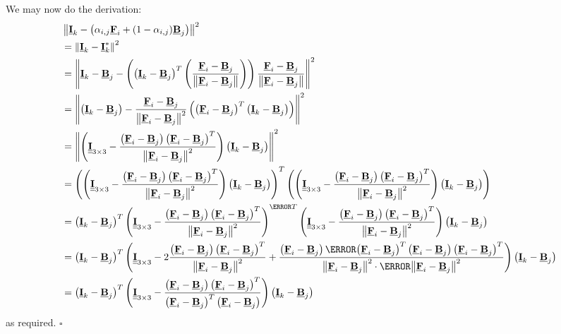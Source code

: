 \documentclass{article}
\def\vt#1{\underline{\mathbf{#1}}}
\def\mt#1{\underline{\underline{\mathbf{#1}}}}
\begin{document}
We may now do the derivation:
\begin{align*}
    &\left\| \vt I_k - \left( \alpha_{i,j}\vt F_i + (1-\alpha_{i,j})\vt B_j\right)  \right\|^2 \\
    &= \left\| \vt I_k -\vt I_k^*  \right\|^2\\
    &= \left\| \vt I_k - \vt B_j - \left( \left(\vt I_k - \vt B_j\right)^T \left( \frac{\vt F_i - \vt B_j}{\left\| \vt F_i - \vt B_j \right\|}\right) \right) \frac{\vt F_i - \vt B_j}{\left\| \vt F_i - \vt B_j \right\|}   \right\|^2 \\
    &= \left\| \left(\vt I_k - \vt B_j\right) - \frac{\vt F_i - \vt B_j}{\left\| \vt F_i - \vt B_j \right\|^2} \left( \left( \vt F_i - \vt B_j \right)^T \left(\vt I_k - \vt B_j\right)  \right)    \right\|^2 \\
    &= \left\| \left( \mt I_{3\times 3} - \frac{\left(\vt F_i - \vt B_j\right)\left( \vt F_i - \vt B_j \right)^T}{\left\| \vt F_i - \vt B_j \right\|^2}  \right)    \left(\vt I_k - \vt B_j\right)  \right\|^2 \\
    &= \left(\left( \mt I_{3\times 3} - \frac{\left(\vt F_i - \vt B_j\right)\left( \vt F_i - \vt B_j \right)^T}{\left\| \vt F_i - \vt B_j \right\|^2}  \right)    \left(\vt I_k - \vt B_j\right)\right)^T\left(\left( \mt I_{3\times 3} - \frac{\left(\vt F_i - \vt B_j\right)\left( \vt F_i - \vt B_j \right)^T}{\left\| \vt F_i - \vt B_j \right\|^2}  \right)    \left(\vt I_k - \vt B_j\right)\right) \\
    &= \left(\vt I_k - \vt B_j\right)^T \left( \mt I_{3\times 3} - \frac{\left(\vt F_i - \vt B_j\right)\left( \vt F_i - \vt B_j \right)^T}{\left\| \vt F_i - \vt B_j \right\|^2}  \right)^{\cancel{T}}     \left( \mt I_{3\times 3} - \frac{\left(\vt F_i - \vt B_j\right)\left( \vt F_i - \vt B_j \right)^T}{\left\| \vt F_i - \vt B_j \right\|^2}  \right)    \left(\vt I_k - \vt B_j\right) \\
    &= \left(\vt I_k - \vt B_j\right)^T \left( \mt I_{3\times 3} - 2\frac{\left(\vt F_i - \vt B_j\right)\left( \vt F_i - \vt B_j \right)^T}{\left\| \vt F_i - \vt B_j \right\|^2} + \frac{\left(\vt F_i - \vt B_j\right)\cancel{\left( \vt F_i - \vt B_j \right)^T \left(\vt F_i - \vt B_j\right)}\left( \vt F_i - \vt B_j \right)^T }{\left\| \vt F_i - \vt B_j \right\|^2 \cdot \cancel{\left\| \vt F_i - \vt B_j \right\|^2}}   \right)   \left(\vt I_k - \vt B_j\right) \\
    &= \left(\vt I_k - \vt B_j\right)^T \left( \mt I_{3\times 3} -  \frac{\left(\vt F_i - \vt B_j\right)\left( \vt F_i - \vt B_j \right)^T}{\left( \vt F_i - \vt B_j \right)^T\left( \vt F_i - \vt B_j \right)}   \right)   \left(\vt I_k - \vt B_j\right)
\end{align*}
as required. \hfill$\square$
\end{document}
